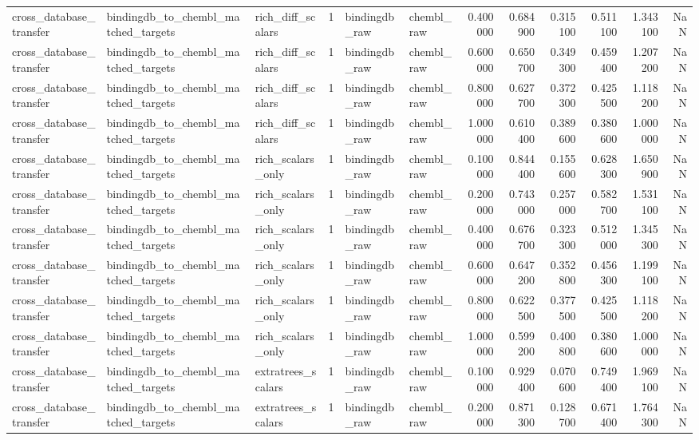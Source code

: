 \begin{longtable}{lllrllrrrrrr}
cross\_database\_transfer & bindingdb\_to\_chembl\_matched\_targets & rich\_diff\_scalars & 1 & bindingdb\_raw & chembl\_raw & 0.400000 & 0.684900 & 0.315100 & 0.511100 & 1.343100 & NaN \\
cross\_database\_transfer & bindingdb\_to\_chembl\_matched\_targets & rich\_diff\_scalars & 1 & bindingdb\_raw & chembl\_raw & 0.600000 & 0.650700 & 0.349300 & 0.459400 & 1.207200 & NaN \\
cross\_database\_transfer & bindingdb\_to\_chembl\_matched\_targets & rich\_diff\_scalars & 1 & bindingdb\_raw & chembl\_raw & 0.800000 & 0.627700 & 0.372300 & 0.425500 & 1.118200 & NaN \\
cross\_database\_transfer & bindingdb\_to\_chembl\_matched\_targets & rich\_diff\_scalars & 1 & bindingdb\_raw & chembl\_raw & 1.000000 & 0.610400 & 0.389600 & 0.380600 & 1.000000 & NaN \\
cross\_database\_transfer & bindingdb\_to\_chembl\_matched\_targets & rich\_scalars\_only & 1 & bindingdb\_raw & chembl\_raw & 0.100000 & 0.844400 & 0.155600 & 0.628300 & 1.650900 & NaN \\
cross\_database\_transfer & bindingdb\_to\_chembl\_matched\_targets & rich\_scalars\_only & 1 & bindingdb\_raw & chembl\_raw & 0.200000 & 0.743000 & 0.257000 & 0.582700 & 1.531100 & NaN \\
cross\_database\_transfer & bindingdb\_to\_chembl\_matched\_targets & rich\_scalars\_only & 1 & bindingdb\_raw & chembl\_raw & 0.400000 & 0.676700 & 0.323300 & 0.512000 & 1.345300 & NaN \\
cross\_database\_transfer & bindingdb\_to\_chembl\_matched\_targets & rich\_scalars\_only & 1 & bindingdb\_raw & chembl\_raw & 0.600000 & 0.647200 & 0.352800 & 0.456300 & 1.199100 & NaN \\
cross\_database\_transfer & bindingdb\_to\_chembl\_matched\_targets & rich\_scalars\_only & 1 & bindingdb\_raw & chembl\_raw & 0.800000 & 0.622500 & 0.377500 & 0.425500 & 1.118200 & NaN \\
cross\_database\_transfer & bindingdb\_to\_chembl\_matched\_targets & rich\_scalars\_only & 1 & bindingdb\_raw & chembl\_raw & 1.000000 & 0.599200 & 0.400800 & 0.380600 & 1.000000 & NaN \\
cross\_database\_transfer & bindingdb\_to\_chembl\_matched\_targets & extratrees\_scalars & 1 & bindingdb\_raw & chembl\_raw & 0.100000 & 0.929400 & 0.070600 & 0.749400 & 1.969100 & NaN \\
cross\_database\_transfer & bindingdb\_to\_chembl\_matched\_targets & extratrees\_scalars & 1 & bindingdb\_raw & chembl\_raw & 0.200000 & 0.871300 & 0.128700 & 0.671400 & 1.764300 & NaN \\

\end{longtable}

